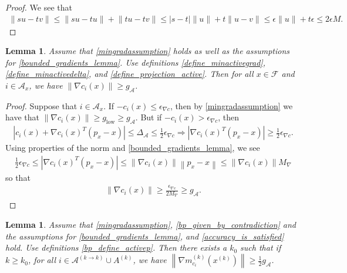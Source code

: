 \documentclass{article}
\newtheorem{lemma}[theorem]{Lemma}
\theoremstyle{case}
\newcommand{\feasible}{{\mathcal F}}
\newcommand{\gmcik}{{\nabla m_{c_i}^{(k)}\left(\xk\right)}}
\newcommand{\maxgrad}{{M_{\nabla}}}
\newcommand{\minactivegraddelta}{{\Delta_{\mathcal A}}}
\newcommand{\minactivegrad}{{ g_{\mathcal A} }}
\newcommand{\mingradepsilon}{{\epsilon_{\nabla c}}}
\newcommand{\mingrad}{{ g_{\text{low}} }}
\newcommand{\xk}{{x^{(k)}}}
\begin{document}
\begin{proof}
We see that
\begin{align}
\bigg\|su - tv\bigg\| \le \bigg\|su - tu\bigg\| + \bigg\|tu- tv\bigg\| \le |s - t| \|u\| + t \|u - v\| \le \epsilon \|u\| + t \epsilon \le 2 \epsilon M.
\end{align}
\end{proof}




\begin{lemma}
\label{min_active_gradient_lemma}
Assume that \cref{mingradassumption} holds as well as the assumptions for \cref{bounded_gradients_lemma}.
Use definitions \cref{define_minactivegrad}, \cref{define_minactivedelta}, and \cref{define_projection_active}.
Then for all $x \in \feasible$ and $i \in \mathcal A_x$, we have $\left\|\nabla c_i(x)\right\| \ge \minactivegrad$.
\end{lemma}

\begin{proof}
Suppose that $i \in \mathcal A_x$.
If $-c_i(x) \le \mingradepsilon$, then by \cref{mingradassumption} we have that $\|\nabla c_i(x)\| \ge \mingrad \ge \minactivegrad$.
But if $-c_i(x) > \mingradepsilon$, then
\begin{align*}
\left|c_i(x) + \nabla c_i(x)^T(p_x - x)\right| \le \minactivegraddelta \le \frac 1 2 \mingradepsilon
\Longrightarrow \left|\nabla c_i(x)^T(p_x - x)\right| \ge \frac 1 2 \mingradepsilon.
\end{align*}
Using properties of the norm and \cref{bounded_gradients_lemma}, we see
\begin{align*}
\frac 1 2 \mingradepsilon \le \left|\nabla c_i(x)^T(p_x - x)\right| \le \left\|\nabla c_i(x)\right\|\left\|p_x - x\right\| \le \left\|\nabla c_i(x)\right\| \maxgrad
\end{align*}
so that 
\begin{align*}
\left\|\nabla c_i(x)\right\| \ge \frac {\mingradepsilon} {2 \maxgrad} \ge \minactivegrad.
\end{align*}
\end{proof}




\begin{lemma}
\label{min_active_model_gradient_lemma}
Assume that
\cref{mingradassumption}, \cref{bp_given_by_contradiction}
and the assumptions for
\cref{bounded_gradients_lemma}, and \cref{accuracy_is_satisfied} hold.
Use definitions \cref{bp_define_activep}.
Then there exists a $k_0$ such that if $k \ge k_0$,
for all $i \in \mathcal A^{(k\to k)} \cup A^{(k)}$, we have $\left\|\gmcik\right\| \ge \frac 1 2 \minactivegrad$.
\end{lemma}
\end{document}
